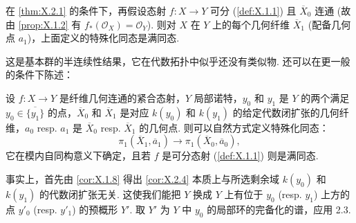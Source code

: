 \begin{corollary}\label{cor:X.2.3}
在 \ref{thm:X.2.1} 的条件下，再假设态射 $f \colon X \to Y$ 可分 (\cref{def:X.1.1}) 且 $\overline{X}_0$ 连通 (故由 \ref{prop:X.1.2} 有 $f_*(\mathcal{O}_X) = \mathcal{O}_Y$). 则对 $X$ 在 $Y$ 上的每个几何纤维 $\overline{X}_1$ (配备几何点 $a_1$)，上面定义的特殊化同态是满同态.
\end{corollary}

这是基本群的半连续性结果，它在代数拓扑中似乎还没有类似物. 还可以在更一般的条件下陈述：

\begin{corollary}\label{cor:X.2.4}
设 $f \colon X \to Y$ 是纤维几何连通的紧合态射，$Y$ 局部诺特，$y_0$ 和 $y_1$ 是 $Y$ 的两个满足 $y_0 \in \overline{\{y_1\}}$ 的点，$\overline{X}_0$ 和 $\overline{X}_1$ 是对应 $k(y_0)$ 和 $k(y_1)$ 的给定代数闭扩张的几何纤维，$a_0$ resp. $a_1$ 是 $\overline{X}_0$ resp. $\overline{X}_1$ 的几何点. 则可以自然方式定义特殊化同态：
\[
\pi_1(\overline{X}_1, \overline{a}_1) \longrightarrow \pi_1(\overline{X}_0, \overline{a}_0),
\]
它在模内自同构意义下确定，且若 $f$ 是可分态射 (\cref{def:X.1.1}) 则是满同态.
\end{corollary}

事实上，首先由 \ref{cor:X.1.8} 得出 \ref{cor:X.2.4} 本质上与所选剩余域 $k(y_0)$ 和 $k(y_1)$ 的代数闭扩张无关. 这使我们能把 $Y$ 换成 $Y$ 上有位于 $y_0$ (resp. $y_1$) 上方的点 $y'_0$ (resp. $y'_1$) 的预概形 $Y'$. 取 $Y'$ 为 $Y$ 中 $y_0$ 的局部环的完备化的谱，应用 2.3.


